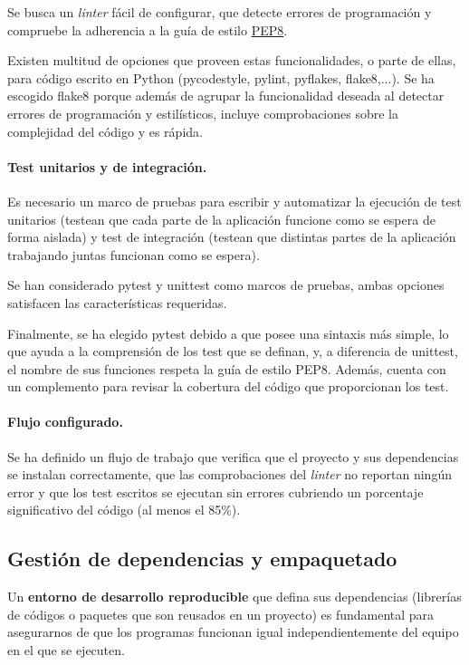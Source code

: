 Se busca un \textit{linter} fácil de configurar, que detecte errores de programación y compruebe la adherencia a la guía de estilo \href{https://peps.python.org/pep-0008/}{PEP8}.

Existen multitud de opciones que proveen estas funcionalidades, o parte de ellas, para código escrito en Python (pycodestyle, pylint, pyflakes, flake8,...). Se ha escogido flake8 porque además de agrupar la funcionalidad deseada al detectar errores de programación y estilísticos, incluye comprobaciones sobre la complejidad del código y es rápida.

\paragraph*{Test unitarios y de integración.}
\label{sec:tests}

Es necesario un marco de pruebas para escribir y automatizar la ejecución de test unitarios (testean que cada parte de la aplicación funcione como se espera de forma aislada) y test de integración (testean que distintas partes de la aplicación trabajando juntas funcionan como se espera).

Se han considerado pytest y unittest como marcos de pruebas, ambas opciones satisfacen las características requeridas.

Finalmente, se ha elegido pytest debido a que posee una sintaxis más simple, lo que ayuda a la comprensión de los test que se definan, y, a diferencia de unittest, el nombre de sus funciones respeta la guía de estilo PEP8. Además, cuenta con un complemento para revisar la cobertura del código que proporcionan los test.

\paragraph*{Flujo configurado.}

Se ha definido un flujo de trabajo que verifica que el proyecto y sus dependencias se instalan correctamente, que las comprobaciones del \textit{linter} no reportan ningún error y que los test escritos se ejecutan sin errores cubriendo un porcentaje significativo del código (al menos el 85\%).

\subsection{Gestión de dependencias y empaquetado}
\label{sec:poetry}

Un \textbf{entorno de desarrollo reproducible} que defina sus dependencias
(librerías de códigos o paquetes que son reusados en un proyecto) es fundamental para asegurarnos de que los programas funcionan igual independientemente del equipo en el que se ejecuten.

